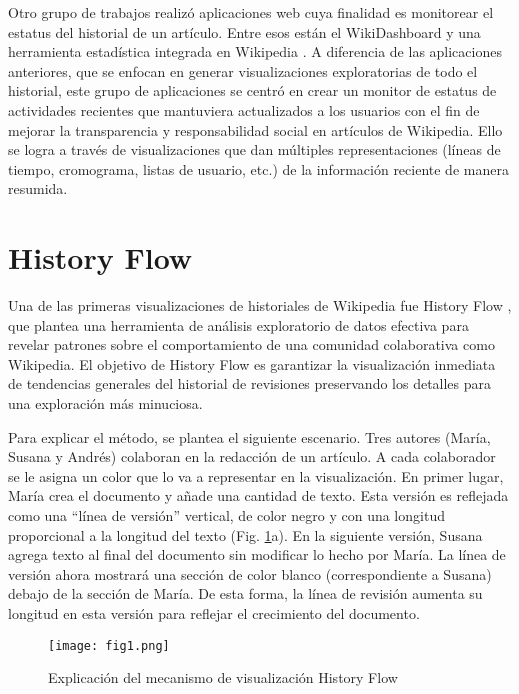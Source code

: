 Otro grupo de trabajos realizó aplicaciones web cuya finalidad es monitorear el estatus del historial de un artículo.  Entre esos están el WikiDashboard \cite{Suh2008a} y una herramienta estadística integrada en Wikipedia \cite{Akawikipedia.orga}. A diferencia de las aplicaciones anteriores, que se enfocan en generar visualizaciones exploratorias de todo el historial, este grupo de aplicaciones se centró en crear un monitor de estatus de actividades recientes que mantuviera actualizados a los usuarios con el fin de mejorar la transparencia y responsabilidad social en artículos de Wikipedia. Ello se logra a través de visualizaciones que dan múltiples representaciones (líneas de tiempo, cromograma, listas de usuario, etc.) de la información reciente de manera resumida.

\section{History Flow}
Una de las primeras visualizaciones de historiales de Wikipedia fue History Flow \cite{Viegas2004a}, que plantea una herramienta de análisis exploratorio de datos efectiva para revelar patrones sobre el comportamiento de una comunidad colaborativa como Wikipedia. El objetivo de History Flow es garantizar la visualización inmediata de tendencias generales del historial de revisiones preservando los detalles para una exploración más minuciosa.

Para explicar el método, se plantea el siguiente escenario. Tres autores (María, Susana y Andrés) colaboran en la redacción de un artículo. A cada colaborador se le asigna un color que lo va a representar en la visualización. En primer lugar, María crea el documento y añade una cantidad de texto. Esta versión es reflejada como una “línea de versión” vertical, de color negro y con una longitud proporcional a la longitud del texto (Fig. \ref{fig1}a). En la siguiente versión, Susana agrega texto al final del documento sin modificar lo hecho por María. La línea de versión ahora mostrará una sección de color blanco (correspondiente a Susana) debajo de la sección de María. De esta forma, la línea de revisión aumenta su longitud en esta versión para reflejar el crecimiento del documento.

\begin{figure}[ht]
  \centering
  \texttt{[image: fig1.png]}
  \caption{Explicación del mecanismo de visualización History Flow}
  \label{fig1}
\end{figure}

